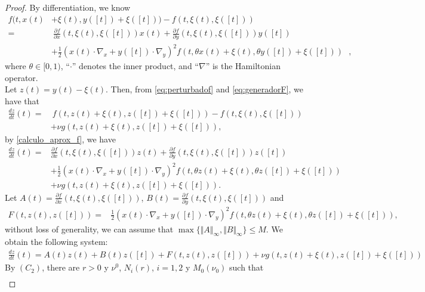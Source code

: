 \documentclass[english,,reqno]{amsart}
\numberwithin{equation}{section}
\theoremstyle{plain}
\theoremstyle{definition}
\theoremstyle{remark}
\begin{document}
\begin{proof}
By differentiation, we know
\begin{equation}\label{calculo_aprox_f}
\begin{aligned}
f(t,x(t) &+\xi(t),y([t])+\xi([t]))-f(t,\xi(t),\xi([t])) 
\\
=&~{}\frac{\partial f}{\partial x}(t,\xi(t),\xi([t]))x(t) 
+\frac{\partial f}{\partial y}(t,\xi(t),\xi([t]))y([t]) \\
&+\frac{1}{2}(x(t)\cdot \nabla_{x}+y([t])\cdot \nabla_{y})^{2}f(t,\theta x(t)+\xi(t),\theta y([t])+\xi([t])) \ \ \ 
,
\end{aligned}
\end{equation}
where $\theta \in [0, 1)$, ``$\cdot$'' denotes the inner product, and ``$\nabla$'' is the Hamiltonian operator. \\  
Let $z(t) = y(t) - \xi(t)$. Then, from \eqref{eq:perturbadof} and \eqref{eq:generadorF}, we have that
\[
\begin{aligned}
\frac{dz}{dt}(t)=&~{}f(t,z(t)+\xi(t),z([t])+\xi([t]))-f(t,\xi(t),\xi([t]))\\
 & +\nu g\left(t,z(t)+\xi(t),z([t])+\xi([t])\right),
\end{aligned}
\]
by \eqref{calculo_aprox_f}, we have
\[
\begin{aligned}
\frac{dz}{dt}(t)=&\frac{\partial f}{\partial x}(t,\xi(t),\xi([t]))z(t)+\frac{\partial f}{\partial y}(t,\xi(t),\xi([t]))z([t])\\
 &+\frac{1}{2}(x(t)\cdot \nabla_{x}+y([t])\cdot \nabla_{y})^{2}f(t,\theta z(t)+\xi(t),\theta z([t])+\xi([t]))\\
 &+\nu g\left(t,z(t)+\xi(t),z([t])+\xi([t])\right).
\end{aligned}
\]
Let $A(t)=\frac{\partial f}{\partial x}(t,\xi(t),\xi([t])) $, $B(t)=\frac{\partial f}{\partial y}(t,\xi(t),\xi([t]))$ and 
\[
\begin{aligned}
F(t,z(t),z([t]))=&\frac{1}{2}(x(t)\cdot \nabla_{x}+y([t])\cdot \nabla_{y})^{2}f(t,\theta z(t)+\xi(t),\theta z([t])+\xi([t])),
\end{aligned}
\]
without loss of generality, we can assume that  
$\max \{ \Vert A \Vert_{\infty}, \Vert B \Vert_{\infty} \} \leq M$.  
We obtain the following system:
\[
\begin{aligned}
\frac{dz}{dt}(t)=A(t)z(t)+B(t)z([t])+F(t,z(t),z([t]))+\nu g\left(t,z(t)+\xi(t),z([t])+\xi([t])\right)
\end{aligned}
\]
By $(C_2)$, there are $r>0$ y $\nu^{0}$, $N_i(r)$, $i=1,2$ y $M_0(\nu_{0})$ such that
\[
\begin{aligned}

\end{aligned}\]
\end{proof}
\end{document}
